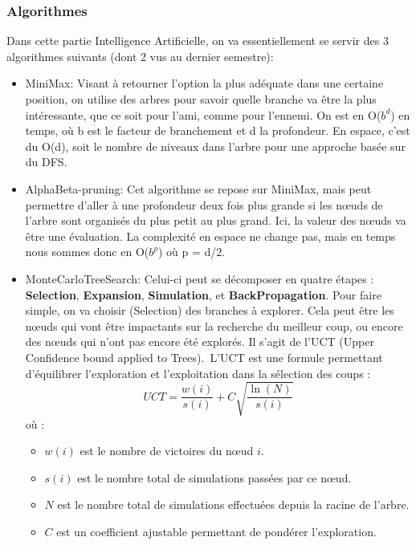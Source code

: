 \documentclass{article}
\begin{document}
\subsubsection{Algorithmes}
Dans cette partie Intelligence Artificielle, on va essentiellement se servir des 3 algorithmes suivants (dont 2 vus au dernier semestre):
\begin{itemize}
    \item MiniMax: Visant à retourner l'option la plus adéquate dans une certaine position, on utilise des arbres pour savoir quelle branche va être la
    plus intéressante, que ce soit pour l'ami, comme pour l'ennemi. On est en O($b^d$) en temps, où b est le facteur de branchement et d la profondeur.
    En espace, c'est du O(d), soit le nombre de niveaux dans l'arbre pour une approche basée sur du DFS.
    \item AlphaBeta-pruning: Cet algorithme se repose sur MiniMax, mais peut permettre d'aller à une profondeur deux fois plus grande si les nœuds de
    l'arbre sont organisés du plus petit au plus grand. Ici, la valeur des nœuds va être une évaluation. La complexité en espace ne change pas, mais
    en temps nous sommes donc en O($b^p$) où p = d/2.
    \item MonteCarloTreeSearch:
    Celui-ci peut se décomposer en quatre étapes : \textbf{Selection}, \textbf{Expansion}, \textbf{Simulation}, et \textbf{BackPropagation}. Pour faire simple, on va choisir (Selection) des branches à explorer. Cela peut être les nœuds qui vont être impactants sur la recherche du meilleur coup, ou encore des nœuds qui n'ont pas encore été explorés. Il s'agit de l'UCT (Upper Confidence bound applied to Trees).\
    L'UCT est une formule permettant d'équilibrer l'exploration et l'exploitation dans la sélection des coups :
    \begin{equation}
    UCT = \frac{w(i)}{s(i)} + C \sqrt{\frac{\ln(N)}{s(i)}}
    \end{equation}
    où :
    \begin{itemize}
        \item $w(i)$ est le nombre de victoires du nœud $i$.
        \item $s(i)$ est le nombre total de simulations passées par ce nœud.
        \item $N$ est le nombre total de simulations effectuées depuis la racine de l'arbre.
        \item $C$ est un coefficient ajustable permettant de pondérer l'exploration.\
    \end{itemize} 


\end{itemize}
\end{document}
